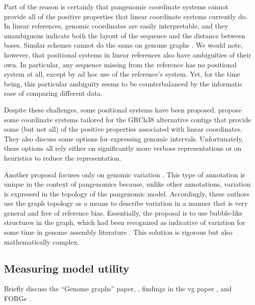 Part of the reason is certainly that pangenomic coordinate systems cannot provide all of the positive properties that linear coordinate systems currently do.
In linear references, genomic coordinates are easily interpretable, and they unambiguous indicate both the layout of the sequence and the distance between bases.
Similar schemes cannot do the same on genome graphs \cite{Rand_2017}.
We would note, however, that positional systems in linear references also have ambiguities of their own.
In particular, any sequence missing from the reference has no positional system at all, except by ad hoc use of the reference's system.
Yet, for the time being, this particular ambiguity seems to be counterbalanced by the informatic ease of comparing different data.

Despite these challenges, some positional systems have been proposed.
\citeauthor{Rand_2017} propose some coordinate systems tailored for the GRCh38 alternative contigs that provide some (but not all) of the positive properties associated with linear coordinates.
They also discuss some options for expressing genomic intervals.
Unfortunately, these options all rely either on significantly more verbose representations or on heuristics to reduce the representation.

Another proposal focuses only on genomic variation \cite{paten2018superbubbles}.
This type of annotation is unique in the context of pangenomics because, unlike other annotations, variation is expressed in the topology of the pangenomic model.
Accordingly, these authors use the graph topology as a means to describe variation in a manner that is very general and free of reference bias.
Essentially, the proposal is to use bubble-like structures in the graph, which had been recognized as indicative of variation for some time in genome assembly literature \cite{Iqbal_2012, Onodera_2013}.
This solution is rigorous but also mathematically complex.

\subsection{Measuring model utility}

Briefly discuss the ``Genome graphs'' paper, \cite{Novak_2017a}, findings in the vg paper \cite{Garrison_2018}, and FORGe \cite{Pritt_2018}.


